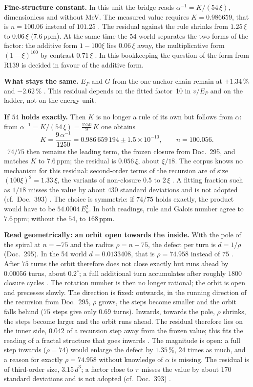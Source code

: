 \textbf{Fine-structure constant.} In this unit the bridge reads $\alpha^{-1}=K/(54\,\xi)$,
dimensionless and without MeV. The measured value requires $K=0.986659$, that is $n=100.06$ instead
of $101.25$ \KM. The residual against the rule shrinks from $1.25\,\xi$ to $0.06\,\xi$
($7.6$\,ppm). At the same time the 54 world separates the two forms of the factor: the additive form
$1-100\xi$ lies $0.06\,\xi$ away, the multiplicative form $(1-\xi)^{100}$ by contrast $0.71\,\xi$
\KM. In this bookkeeping the question of the form from R139 is decided in favour of the additive
form.

\textbf{What stays the same.} $E_P$ and $G$ from the one-anchor chain remain at $+1.34\,\%$ and
$-2.62\,\%$ \KM. This residual depends on the fitted factor~10 in $v/E_P$ and on the ladder, not on
the energy unit.

\textbf{If $54$ holds exactly.} Then $K$ is no longer a rule of its own but follows from $\alpha$:
from $\alpha^{-1}=K/(54\,\xi)=\tfrac{1250}{9}\,K$ one obtains
\begin{equation}
  K=\frac{9\,\alpha^{-1}}{1250}=0.986\,659\,194\pm1.5\times10^{-10},\qquad n=100.056 .
\end{equation}
\KM\ $74/75$ then remains the leading term, the frozen closure from Doc.~295, and matches $K$ to
$7.6$\,ppm; the residual is $0.056\,\xi$, about $\xi/18$. The corpus knows no mechanism for this
residual: second-order terms of the recursion are of size $(100\xi)^2=1.33\,\xi$, the variants of
non-closure $0.5$ to $2\,\xi$ \KM. A fitting fraction such as $1/18$ misses the value by about $430$
standard deviations and is not adopted (cf.\ Doc.~393) \SM. The choice is symmetric: if $74/75$ holds
exactly, the product would have to be $54.0004\,E_u^2$. In both readings, rule and Galois number
agree to $7.6$\,ppm; without the $54$, to $168$\,ppm.

\textbf{Read geometrically: an orbit open towards the inside.} With the pole of the spiral at
$n=-75$ and the radius $\rho=n+75$, the defect per turn is $d=1/\rho$ (Doc.~295). In the 54 world
$d=0.0133408$, that is $\rho=74.958$ instead of $75$ \KM. After $75$ turns the orbit therefore does
not close exactly but runs ahead by $0.00056$ turns, about $0.2^\circ$; a full additional turn
accumulates after roughly $1800$ closure cycles \KM. The rotation number is then no longer rational;
the orbit is open and precesses slowly. The direction is fixed: outwards, in the running direction of
the recursion from Doc.~295, $\rho$ grows, the steps become smaller and the orbit falls behind ($75$
steps give only $0.69$ turns). Inwards, towards the pole, $\rho$ shrinks, the steps become larger
and the orbit runs ahead. The residual therefore lies on the inner side, $0.042$ of a recursion step
away from the frozen value; this fits the reading of a fractal structure that goes inwards \SM. The
magnitude is open: a full step inwards ($\rho=74$) would enlarge the defect by $1.35\,\%$, $24$ times as much, and a reason for
exactly $\rho=74.958$ without knowledge of $\alpha$ is missing. The residual is of third-order size,
$3.15\,d^3$; a factor close to $\pi$ misses the value by about $170$ standard deviations and is not
adopted (cf.\ Doc.~393) \SM.

